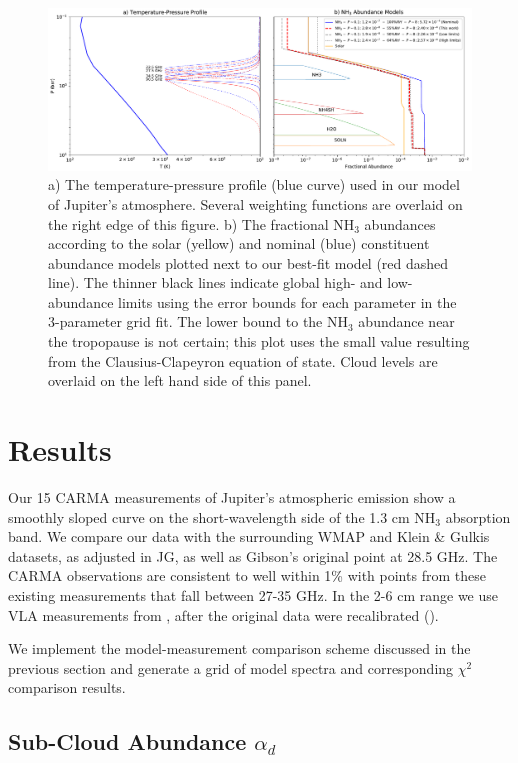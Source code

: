 \documentclass{article}
\begin{document}
	\begin{figure}
		\centering
		\includegraphics[width=\textwidth]{final_tp_const.pdf}
		\caption{\label{fig:tp}a) The temperature-pressure profile (blue curve) used in our model of Jupiter's atmosphere. Several weighting functions are overlaid on the right edge of this figure. b) The fractional NH$_{3}$ abundances according to the solar (yellow) and nominal (blue) constituent abundance models plotted next to our best-fit model (red dashed line). The thinner black lines indicate global high- and low-abundance limits using the error bounds for each parameter in the 3-parameter grid fit. The lower bound to the NH$_{3}$ abundance near the tropopause is not certain; this plot uses the small value resulting from the Clausius-Clapeyron equation of state. Cloud levels are overlaid on the left hand side of this panel.}
	\end{figure}


\section{Results} \label{s:results}

	Our 15 CARMA measurements of Jupiter's atmospheric emission show a smoothly sloped curve on the short-wavelength side of the 1.3 cm NH$_{3}$ absorption band.
	We compare our data with the surrounding WMAP and Klein \& Gulkis datasets, as adjusted in JG, as well as Gibson's original point at 28.5 GHz. The CARMA observations are consistent to well within 1\% with points from these existing measurements that fall between 27-35 GHz. In the 2-6 cm range we use VLA measurements from \citealt{2016Sci...352.1198D}, after the original data were recalibrated (\citealt{2016AGUFM.P31D..08D}).
	

	We implement the model-measurement comparison scheme discussed in the previous section and generate a grid of model spectra and corresponding $\chi^{2}$ comparison results.

\subsection{Sub-Cloud Abundance $\alpha_{d}$}
\end{document}
